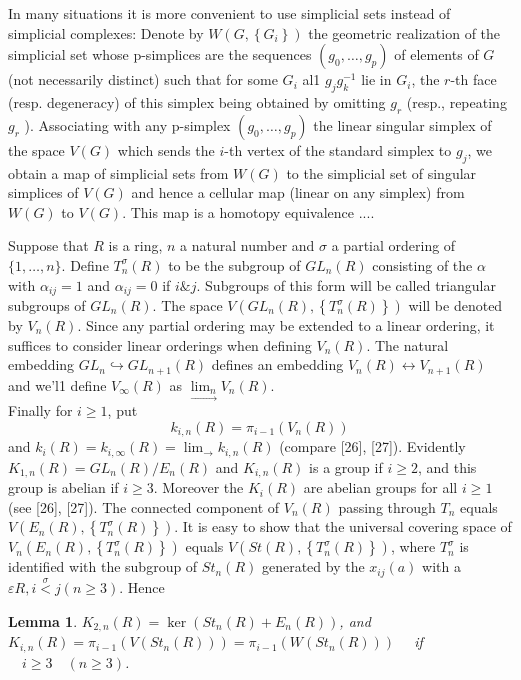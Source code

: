 \documentclass{book}
\newtheorem{lemm}{Lemma}
\begin{document}
In many situations it is more convenient to use simplicial sets instead of simplicial complexes: Denote by $W\left(G,\left\{G_i\right\}\right)$ the geometric realization of the simplicial set whose p-simplices are the sequences $\left(g_0, \ldots, g_p\right)$ of elements of $G$ (not necessarily distinct) such that for some $G_i$ al1 $g_j g_k^{-1}$ lie in $G_i$, the $r$-th face (resp. degeneracy) of this simplex being obtained by omitting $g_r$ (resp., repeating $g_r$ ). Associating with any p-simplex $\left(g_0, \ldots, g_p\right)$ the linear singular simplex of the space $V(G)$ which sends the $i$-th vertex of the standard simplex to $g_j$, we obtain a map of simplicial sets from $W(G)$ to the simplicial set of singular simplices of $V(G)$ and hence a cellular map (linear on any simplex) from $W(G)$ to $V(G)$. This map is a homotopy equivalence .... %

Suppose that $R$ is a ring, $n$ a natural number and $\sigma$ a partial ordering of $\{1, \ldots, n\}$. Define $T_n^\sigma(R)$ to be the subgroup of $G L_n(R)$ consisting of the $\alpha$ with $\alpha_{i j}=1$ and $\alpha_{i j}=0$ if $i \& j$. Subgroups of this form will be called triangular subgroups of $G L_n(R)$. The space $V\left(G L_n(R),\left\{T_n^\sigma(R)\right\}\right)$ will be denoted by $V_n(R)$. Since any partial ordering may be extended to a linear ordering, it suffices to consider linear orderings when defining $V_n(R)$. The natural embedding $G L_n \hookrightarrow G L_{n+1}(R)$ defines an embedding $V_n(R) \longleftrightarrow V_{n+1}(R)$ and we'l1 define $V_{\infty}(R)$ as $\underset{\rightarrow}{\lim _n} V_n(R)$. \\
Finally for $i \geq 1$, put $$k_{i, n}(R)=\pi_{i-1}\left(V_n(R)\right)$$ and $k_i(R)=k_{i, \infty}(R)=\lim _{\rightarrow} k_{i, n}(R)$ (compare [26], [27]). Evidently $K_{1, n}(R)=G L_n(R) / E_n(R)$ and $K_{i, n}(R)$ is a group if $i \geq 2$, and this group is abelian if $i \geq 3$. Moreover the $K_i(R)$ are abelian groups for all $i \geq 1$ (see [26], [27]). The connected component of $V_n(R)$ passing through $T_n$ equals $V\left(E_n(R),\left\{T_n^\sigma(R)\right\}\right)$. It is easy to show that the universal covering space of $V_n\left(E_n(R),\left\{T_n^\sigma(R)\right\}\right)$ equals $V\left(S t(R),\left\{T_n^\sigma(R)\right\}\right)$, where $T_n^\sigma$ is identified with the subgroup of $S t_n(R)$ generated by the $x_{i j}(a)$ with a $\varepsilon R, i \stackrel{\sigma}{<} j(n \geq 3)$. Hence

\begin{lemm}
    $K_{2, n}(R)=\operatorname{ker}\left(S t_n(R)+E_n(R)\right)$, and $K_{i, n}(R)=\pi_{i-1}\left(V\left(S t_n(R)\right)\right)=\pi_{i-1}\left(W\left(S t_n(R)\right)\right) \quad$ if $\quad i \geq 3 \quad(n \geq 3)$.
\end{lemm}    
\end{document}
